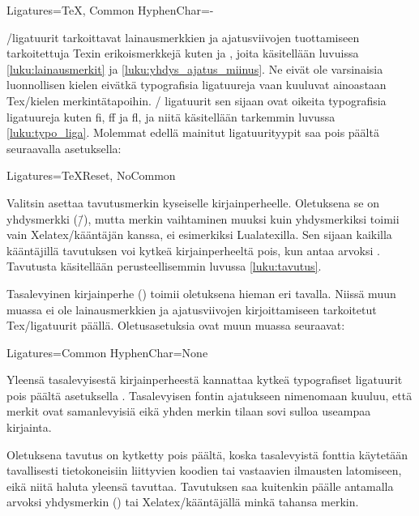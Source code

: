 \begin{koodilohkosis}
  Ligatures={TeX, Common}
  HyphenChar={-}
\end{koodilohkosis}

\-/ligatuurit tarkoittavat lainausmerkkien ja ajatusviivojen
tuottamiseen tarkoitettuja Texin erikoismerkkejä kuten  ja
\koodi{\==}, joita käsitellään luvuissa \ref{luku:lainausmerkit} ja
\ref{luku:yhdys_ajatus_miinus}. Ne eivät ole varsinaisia luonnollisen
kielen eivätkä typografisia ligatuureja vaan kuuluvat ainoastaan
Tex\-/kielen merkintätapoihin. \-/ ligatuurit sen sijaan
ovat oikeita typografisia ligatuureja kuten fi, ff ja fl, ja niitä
käsitellään tarkemmin luvussa \ref{luku:typo_liga}. Molemmat edellä
mainitut ligatuurityypit saa pois päältä seuraavalla asetuksella:

\begin{koodilohkosis}
  Ligatures={TeXReset, NoCommon}
\end{koodilohkosis}

Valitsin  asettaa tavutusmerkin kyseiselle
kirjainperheelle. Oletuksena se on yhdysmerkki (\=/), mutta merkin
vaihtaminen muuksi kuin yhdysmerkiksi toimii vain Xelatex\-/kääntäjän
kanssa, ei esimerkiksi Lualatexilla. Sen sijaan kaikilla kääntäjillä
tavutuksen voi kytkeä kirjainperheeltä pois, kun antaa arvoksi
. Tavutusta käsitellään perusteellisemmin luvussa
\ref{luku:tavutus}.

Tasalevyinen kirjainperhe () toimii oletuksena
hieman eri tavalla. Niissä muun muassa ei ole lainausmerkkien ja
ajatusviivojen kirjoittamiseen tarkoitetut Tex\-/ligatuurit päällä.
Oletusasetuksia ovat muun muassa seuraavat:

\begin{koodilohkosis}
  Ligatures=Common
  HyphenChar=None
\end{koodilohkosis}

Yleensä tasalevyisestä kirjainperheestä kannattaa kytkeä typografiset
ligatuurit pois päältä asetuksella .
Tasalevyisen fontin ajatukseen nimenomaan kuuluu, että merkit ovat
samanlevyisiä eikä yhden merkin tilaan sovi sulloa useampaa kirjainta.

Oletuksena tavutus on kytketty pois päältä, koska tasalevyistä fonttia
käytetään tavallisesti tietokoneisiin liittyvien koodien tai vastaavien
ilmausten latomiseen, eikä niitä haluta yleensä tavuttaa. Tavutuksen saa
kuitenkin päälle antamalla arvoksi yhdysmerkin
() tai Xelatex\-/kääntäjällä minkä
tahansa merkin.


